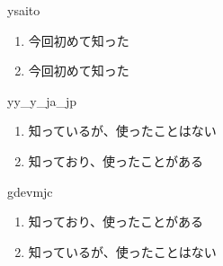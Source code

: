 \begin{prework}{ ysaito }
  \begin{enumerate}
  \item 今回初めて知った
  \item 今回初めて知った
  \end{enumerate}
\end{prework}

\begin{prework}{ yy\_y\_ja\_jp }
  \begin{enumerate}
  \item 知っているが、使ったことはない
  \item 知っており、使ったことがある
  \end{enumerate}
\end{prework}

\begin{prework}{ gdevmjc }
  \begin{enumerate}
  \item 知っており、使ったことがある
  \item 知っているが、使ったことはない
  \end{enumerate}
\end{prework}
